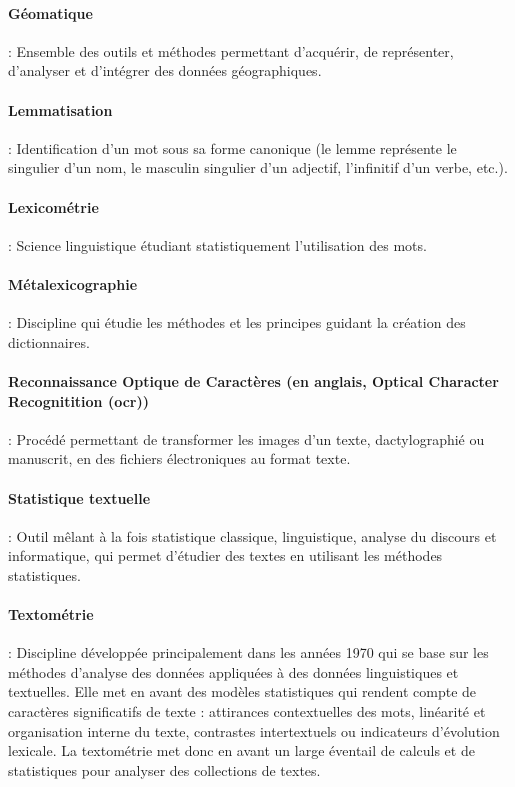 \paragraph{Géomatique} : Ensemble des outils et méthodes permettant d'acquérir, de représenter, d'analyser et d'intégrer des données géographiques. 

\paragraph{Lemmatisation} : Identification d'un mot sous sa forme canonique (le lemme représente le singulier d'un nom, le masculin singulier d'un adjectif, l'infinitif d'un verbe, etc.).

\paragraph{Lexicométrie} : Science linguistique étudiant statistiquement l'utilisation des mots.

\paragraph{Métalexicographie} : Discipline qui étudie les méthodes et les principes guidant la création des dictionnaires.

\paragraph{Reconnaissance Optique de Caractères (en anglais, Optical Character Recognitition (\acrshort{ocr}))} : Procédé permettant de transformer les images d'un texte, dactylographié ou manuscrit, en des fichiers électroniques au format texte.

\paragraph{Statistique textuelle} : Outil mêlant à la fois statistique classique, linguistique, analyse du discours et informatique, qui permet d'étudier des textes en utilisant les méthodes statistiques.

\paragraph{Textométrie} : Discipline développée principalement dans les années 1970 qui se base sur les méthodes d'analyse des données appliquées à des données linguistiques et textuelles. Elle met en avant des modèles statistiques qui rendent compte de caractères significatifs de texte : attirances contextuelles des mots, linéarité et organisation interne du texte, contrastes intertextuels ou indicateurs d'évolution lexicale. La textométrie met donc en avant un large éventail de calculs et de statistiques pour analyser des collections de textes.

